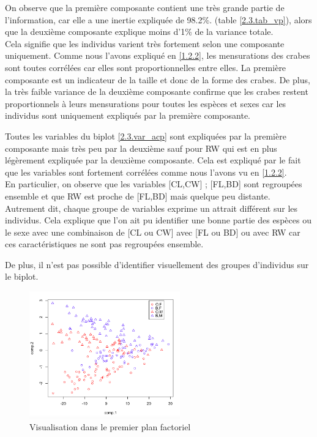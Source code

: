 \documentclass{article}
\begin{document}
On observe que la première composante contient une très grande partie de l'information, car elle a une inertie expliquée de 98.2\%. (table \ref{2.3.tab_vp}), alors que la deuxième composante explique moins d'1\% de la variance totale.\\
Cela signifie que les individus varient très fortement selon une composante uniquement.
Comme nous l'avons expliqué en \ref{1.2.2}, les mensurations des crabes sont toutes corrélées car elles sont proportionnelles entre elles. La première composante est un indicateur de la taille et donc de la forme des crabes. De plus, la très faible variance de la deuxième composante confirme que les crabes restent proportionnels à leurs mensurations pour toutes les espèces et sexes car les individus sont uniquement expliqués par la première composante.


Toutes les variables du biplot \ref{2.3.var_acp} sont expliquées par la première composante mais très peu par la deuxième sauf pour RW qui est en plus légèrement expliquée par la deuxième composante. Cela est expliqué par le fait que les variables sont fortement corrélées comme nous l'avons vu en \ref{1.2.2}.\\
En particulier, on observe que les variables [CL,CW] ; [FL,BD] sont regroupées ensemble et que RW est proche de [FL,BD] mais quelque peu distante. Autrement dit, chaque groupe de variables exprime un attrait différent sur les individus. Cela explique que l'on ait pu identifier une bonne partie des espèces ou le sexe avec une combinaison de [CL ou CW] avec [FL ou BD] ou avec RW car ces caractéristiques ne sont pas regroupées ensemble.

De plus, il n'est pas possible d'identifier visuellement des groupes d'individus sur le biplot.

\begin{figure}[H]
\centering
\includegraphics[width=6.5cm]{./img/acp_crabs_classification_1.png}
\caption{Visualisation dans le premier plan factoriel}
\label{viz_sp_sex_pca}
\end{figure}
\end{document}

